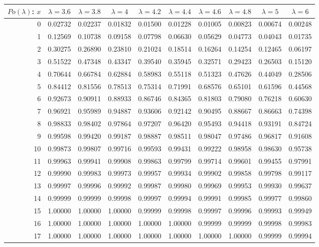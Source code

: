 \documentclass{article}
\begin{document}
{\vspace{8pt minus 6pt}
\begin{tabular}{|r|c|c|c|c|c|c|c|c|c|}
\hline
$Po(\lambda)$: $x$
   & $\lambda=3.6$ & $\lambda=3.8$ & $\lambda=4$ & $\lambda=4.2$ & $\lambda=4.4$ & $\lambda=4.6$ & $\lambda=4.8$ & $\lambda=5$ & $\lambda=6$ \\\hline
  0&0.02732&0.02237&0.01832&0.01500&0.01228&0.01005&0.00823&0.00674&0.00248\\
  1&0.12569&0.10738&0.09158&0.07798&0.06630&0.05629&0.04773&0.04043&0.01735\\
  2&0.30275&0.26890&0.23810&0.21024&0.18514&0.16264&0.14254&0.12465&0.06197\\
  3&0.51522&0.47348&0.43347&0.39540&0.35945&0.32571&0.29423&0.26503&0.15120\\
  4&0.70644&0.66784&0.62884&0.58983&0.55118&0.51323&0.47626&0.44049&0.28506\\
  5&0.84412&0.81556&0.78513&0.75314&0.71991&0.68576&0.65101&0.61596&0.44568\\
  6&0.92673&0.90911&0.88933&0.86746&0.84365&0.81803&0.79080&0.76218&0.60630\\
  7&0.96921&0.95989&0.94887&0.93606&0.92142&0.90495&0.88667&0.86663&0.74398\\
  8&0.98833&0.98402&0.97864&0.97207&0.96420&0.95493&0.94418&0.93191&0.84724\\
  9&0.99598&0.99420&0.99187&0.98887&0.98511&0.98047&0.97486&0.96817&0.91608\\
 10&0.99873&0.99807&0.99716&0.99593&0.99431&0.99222&0.98958&0.98630&0.95738\\
 11&0.99963&0.99941&0.99908&0.99863&0.99799&0.99714&0.99601&0.99455&0.97991\\
 12&0.99990&0.99983&0.99973&0.99957&0.99934&0.99902&0.99858&0.99798&0.99117\\
 13&0.99997&0.99996&0.99992&0.99987&0.99980&0.99969&0.99953&0.99930&0.99637\\
 14&0.99999&0.99999&0.99998&0.99997&0.99994&0.99991&0.99985&0.99977&0.99860\\
 15&1.00000&1.00000&1.00000&0.99999&0.99998&0.99997&0.99996&0.99993&0.99949\\
 16&1.00000&1.00000&1.00000&1.00000&1.00000&0.99999&0.99999&0.99998&0.99983\\
 17&1.00000&1.00000&1.00000&1.00000&1.00000&1.00000&1.00000&0.99999&0.99994\\
\hline
\end{tabular}

}
\end{document}

